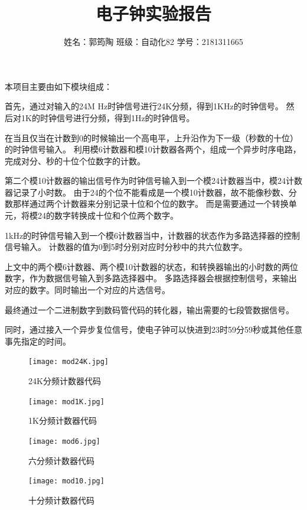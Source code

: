 \documentclass{article}
\author{姓名：郭筠陶 \qquad 班级：自动化82 \qquad 学号：2181311665}
\title{电子钟实验报告}
\begin{document}
\begin{spacing}{1.5}
    \maketitle
    本项目主要由如下模块组成：

    首先，通过对输入的24M Hz时钟信号进行24K分频，得到1KHz的时钟信号。
    然后对1K的时钟信号进行分频，得到1Hz的时钟信号。

    在当且仅当在计数到0的时候输出一个高电平，上升沿作为下一级（秒数的十位）的时钟信号输入。
    利用模6计数器和模10计数器各两个，组成一个异步时序电路，完成对分、秒的十位个位数字的计数。

    第二个模10计数器的输出信号作为时钟信号输入到一个模24计数器当中，模24计数器记录了小时数。
    由于24的个位不能看成是一个模10计数器，故不能像秒数、分数那样通过两个计数器来分别记录十位和个位的数字。
    而是需要通过一个转换单元，将模24的数字转换成十位和个位两个数字。

    1kHz的时钟信号输入到一个模6计数器当中，计数器的状态作为多路选择器的控制信号输入。
    计数器的值为0到5时分别对应时分秒中的共六位数字。

    上文中的两个模6计数器、两个模10计数器的状态，和转换器输出的小时数的两位数字，作为数据信号输入到多路选择器中。
    多路选择器会根据控制信号，来输出对应的数字。同时输出一个对应的片选信号。

    最终通过一个二进制数字到数码管代码的转化器，输出需要的七段管数据信号。

    同时，通过接入一个异步复位信号，使电子钟可以快进到23时59分59秒或其他任意事先指定的时间。
    \begin{figure}[H]
        \centering
        \texttt{[image: mod24K.jpg]}
        \caption{24K分频计数器代码}
    \end{figure}
    
    \begin{figure}[H]
        \centering
        \texttt{[image: mod1K.jpg]}
        \caption{1K分频计数器代码}
    \end{figure}

    \begin{figure}[H]
        \centering
        \texttt{[image: mod6.jpg]}
        \caption{六分频计数器代码}
    \end{figure}
    
    \begin{figure}[H]
        \centering
        \texttt{[image: mod10.jpg]}
        \caption{十分频计数器代码}
    \end{figure}


\end{spacing}
\end{document}
